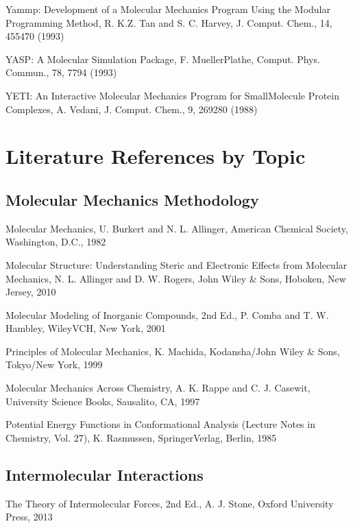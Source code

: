 \documentclass[letterpaper,11pt,english]{sphinxmanual}
\begin{document}

Yammp: Development of a Molecular Mechanics Program Using the Modular Programming Method, R. K.\sphinxhyphen{}Z. Tan and S. C. Harvey, J. Comput. Chem., 14, 455\sphinxhyphen{}470 (1993)


YASP: A Molecular Simulation Package, F. Mueller\sphinxhyphen{}Plathe, Comput. Phys. Commun., 78, 77\sphinxhyphen{}94 (1993)


YETI: An Interactive Molecular Mechanics Program for Small\sphinxhyphen{}Molecule Protein Complexes, A. Vedani, J. Comput. Chem., 9, 269\sphinxhyphen{}280 (1988)


\section{Literature References by Topic}
\label{\detokenize{text/references:literature-references-by-topic}}

\subsection{Molecular Mechanics Methodology}
\label{\detokenize{text/references:molecular-mechanics-methodology}}
Molecular Mechanics, U. Burkert and N. L. Allinger, American Chemical Society, Washington, D.C., 1982

Molecular Structure: Understanding Steric and Electronic Effects from Molecular Mechanics, N. L. Allinger and D. W. Rogers, John Wiley \& Sons, Hoboken, New Jersey, 2010

Molecular Modeling of Inorganic Compounds, 2nd Ed., P. Comba and T. W. Hambley, Wiley\sphinxhyphen{}VCH, New York, 2001

Principles of Molecular Mechanics, K. Machida, Kodansha/John Wiley \& Sons, Tokyo/New York, 1999

Molecular Mechanics Across Chemistry, A. K. Rappe and C. J. Casewit, University Science Books, Sausalito, CA, 1997

Potential Energy Functions in Conformational Analysis (Lecture Notes in Chemistry, Vol. 27), K. Rasmussen, Springer\sphinxhyphen{}Verlag, Berlin, 1985


\subsection{Intermolecular Interactions}
\label{\detokenize{text/references:intermolecular-interactions}}
The Theory of Intermolecular Forces, 2nd Ed., A. J. Stone, Oxford University Press, 2013
\end{document}
